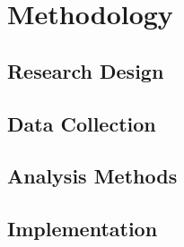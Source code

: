 \section{Methodology}
\label{sec:methodology}


\subsection{Research Design}


\subsection{Data Collection}


\subsection{Analysis Methods}


\subsection{Implementation}

